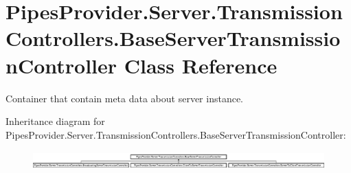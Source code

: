\hypertarget{class_pipes_provider_1_1_server_1_1_transmission_controllers_1_1_base_server_transmission_controller}{}\section{Pipes\+Provider.\+Server.\+Transmission\+Controllers.\+Base\+Server\+Transmission\+Controller Class Reference}
\label{class_pipes_provider_1_1_server_1_1_transmission_controllers_1_1_base_server_transmission_controller}


Container that contain meta data about server instance.  


Inheritance diagram for Pipes\+Provider.\+Server.\+Transmission\+Controllers.\+Base\+Server\+Transmission\+Controller\+:\begin{figure}[H]
\begin{center}
\leavevmode
\includegraphics[height=0.707071cm]{d0/d5b/class_pipes_provider_1_1_server_1_1_transmission_controllers_1_1_base_server_transmission_controller}
\end{center}
\end{figure}
